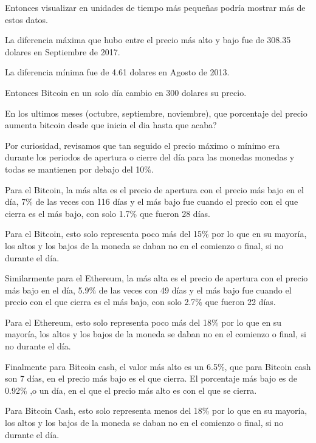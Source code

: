\documentclass[12pt,letterpaper]{article}
\begin{document}

    Entonces visualizar en unidades de tiempo m\'as peque\~nas podr\'ia mostrar m\'as de estos datos.

    La diferencia m\'axima que hubo entre el precio m\'as alto y bajo fue de 308.35 dolares en Septiembre de 2017.

    La diferencia m\'inima fue de 4.61 dolares en Agosto de 2013.

    Entonces Bitcoin en un solo d\'ia cambio en 300 dolares su precio.


    En los ultimos meses (octubre, septiembre, noviembre), que porcentaje del precio aumenta bitcoin desde que inicia el dia hasta que acaba?
    

    Por curiosidad, revisamos que tan seguido el precio máximo o mínimo era durante los periodos de apertura o cierre del día para las monedas monedas y todas se mantienen por debajo del 10\%.

    Para el Bitcoin, la más alta es el precio de apertura con el precio más bajo en el día, 7\% de las veces con 116 días y el más bajo fue cuando el precio con el que cierra es el más bajo, con solo 1.7\% que fueron 28 días.

    Para el Bitcoin, esto solo representa poco más del 15\% por lo que en su mayoría, los altos y los bajos de la moneda se daban no en el comienzo o final, si no durante el día.



    Similarmente para el Ethereum, la más alta es el precio de apertura con el precio más bajo en el día, 5.9\% de las veces con 49 días y el más bajo fue cuando el precio con el que cierra es el más bajo, con solo 2.7\% que fueron 22 días.

    Para el Ethereum, esto solo representa poco más del 18\% por lo que en su mayoría, los altos y los bajos de la moneda se daban no en el comienzo o final, si no durante el día.



    Finalmente para Bitcoin cash, el valor más alto es un 6.5\%, que para Bitcoin cash son 7 días, en el precio más bajo es el que cierra. El porcentaje más bajo es de 0.92\% ,o un día, en el que el precio más alto es con el que se cierra.
    
    Para Bitcoin Cash, esto solo representa menos del 18\% por lo que en su mayoría, los altos y los bajos de la moneda se daban no en el comienzo o final, si no durante el día.
\end{document}
